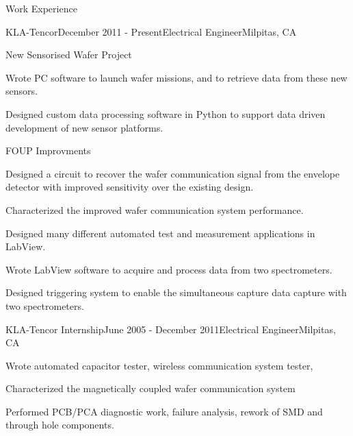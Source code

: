 \documentclass{resume} %
\begin{document}
\begin{rSection}{Work Experience}
\begin{rSubsection}{KLA-Tencor}{December 2011 - Present}{Electrical Engineer}{Milpitas, CA}
\begin{rWorkProject}{New Sensorised Wafer Project}
\item Wrote PC software to launch wafer missions, and to retrieve data from these new sensors.
\item Designed custom data processing software in Python to support data driven development of new sensor platforms.
\end{rWorkProject}

\begin{rWorkProject}{FOUP Improvments}
\item Designed a circuit to recover the wafer communication signal from the envelope detector with improved sensitivity over the existing design.
\item Characterized the improved wafer communication system performance.
\end{rWorkProject}

\smallskip
\item Designed many different automated test and measurement applications in LabView.
\item Wrote LabView software to acquire and process data from two spectrometers.
\item Designed triggering system to enable the simultaneous capture data capture with two spectrometers.
\end{rSubsection}


\begin{rSubsection}{KLA-Tencor Internship}{June 2005 - December 2011}{Electrical Engineer}{Milpitas, CA}
\item Wrote automated capacitor tester, wireless communication system tester, 
\item Characterized the magnetically coupled wafer communication system
\item Performed PCB/PCA diagnostic work, failure analysis, rework of SMD and through hole components.
\end{rSubsection}

\end{rSection}

\end{document}
